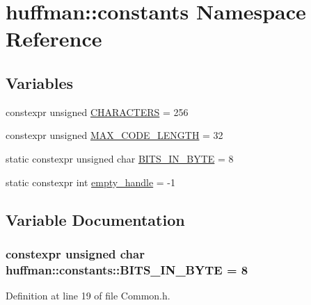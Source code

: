 \hypertarget{namespacehuffman_1_1constants}{}\section{huffman\+:\+:constants Namespace Reference}
\label{namespacehuffman_1_1constants}
\subsection*{Variables}
\begin{DoxyCompactItemize}
\item 
constexpr unsigned \hyperlink{namespacehuffman_1_1constants_a263e0c34ff9ba6afe32efbc1eeabdf88}{C\+H\+A\+R\+A\+C\+T\+E\+RS} = 256
\item 
constexpr unsigned \hyperlink{namespacehuffman_1_1constants_a9bbdd97bbc9095087fd624645d1082fe}{M\+A\+X\+\_\+\+C\+O\+D\+E\+\_\+\+L\+E\+N\+G\+TH} = 32
\item 
static constexpr unsigned char \hyperlink{namespacehuffman_1_1constants_a89cadeae06b1c8968a40bbde1e1929b6}{B\+I\+T\+S\+\_\+\+I\+N\+\_\+\+B\+Y\+TE} = 8
\item 
static constexpr int \hyperlink{namespacehuffman_1_1constants_a807803821447a0285e3dfd195ee698e7}{empty\+\_\+handle} = -\/1
\end{DoxyCompactItemize}


\subsection{Variable Documentation}
\subsubsection[{\texorpdfstring{B\+I\+T\+S\+\_\+\+I\+N\+\_\+\+B\+Y\+TE}{BITS_IN_BYTE}}]{\setlength{\rightskip}{0pt plus 5cm}constexpr unsigned char huffman\+::constants\+::\+B\+I\+T\+S\+\_\+\+I\+N\+\_\+\+B\+Y\+TE = 8\hspace{0.3cm}{\ttfamily [static]}}\hypertarget{namespacehuffman_1_1constants_a89cadeae06b1c8968a40bbde1e1929b6}{}\label{namespacehuffman_1_1constants_a89cadeae06b1c8968a40bbde1e1929b6}


Definition at line 19 of file Common.\+h.

